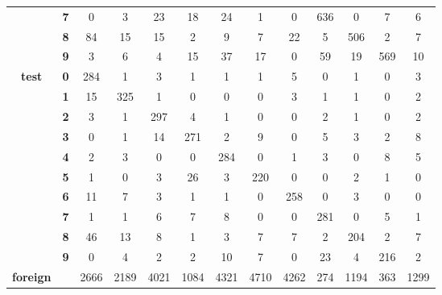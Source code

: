 \begin{table}[htp]
{\begin{tabular}{|c|c|c|c|c|c|c|c|c|c|c|c|c|}
		& \textbf{7} & 0          & 3          & 23         & 18         & 24         & 1          & 0          & 636        & 0          & 7          & 6                \\ \cline{2-13} 
		& \textbf{8} & 84         & 15         & 15         & 2          & 9          & 7          & 22         & 5          & 506        & 2          & 7                \\ \cline{2-13} 
		& \textbf{9} & 3          & 6          & 4          & 15         & 37         & 17         & 0          & 59         & 19         & 569        & 10               \\ \hline
		\multirow{10}{*}{\textbf{test}}     & \textbf{0} & 284        & 1          & 3          & 1          & 1          & 1          & 5          & 0          & 1          & 0          & 3                \\ \cline{2-13} 
		& \textbf{1} & 15         & 325        & 1          & 0          & 0          & 0          & 3          & 1          & 1          & 0          & 2                \\ \cline{2-13} 
		& \textbf{2} & 3          & 1          & 297        & 4          & 1          & 0          & 0          & 2          & 1          & 0          & 2                \\ \cline{2-13} 
		& \textbf{3} & 0          & 1          & 14         & 271        & 2          & 9          & 0          & 5          & 3          & 2          & 8                \\ \cline{2-13} 
		& \textbf{4} & 2          & 3          & 0          & 0          & 284        & 0          & 1          & 3          & 0          & 8          & 5                \\ \cline{2-13} 
		& \textbf{5} & 1          & 0          & 3          & 26         & 3          & 220        & 0          & 0          & 2          & 1          & 0                \\ \cline{2-13} 
		& \textbf{6} & 11         & 7          & 3          & 1          & 1          & 0          & 258        & 0          & 3          & 0          & 0                \\ \cline{2-13} 
		& \textbf{7} & 1          & 1          & 6          & 7          & 8          & 0          & 0          & 281        & 0          & 5          & 1                \\ \cline{2-13} 
		& \textbf{8} & 46         & 13         & 8          & 1          & 3          & 7          & 7          & 2          & 204        & 2          & 7                \\ \cline{2-13} 
		& \textbf{9} & 0          & 4          & 2          & 2          & 10         & 7          & 0          & 23         & 4          & 216        & 2                \\ \hline
		\textbf{foreign}                    & \textbf{}  & 2666       & 2189       & 4021       & 1084       & 4321       & 4710       & 4262       & 274        & 1194       & 363        & 1299             \\ \hline
	\end{tabular}
}
\end{table}


